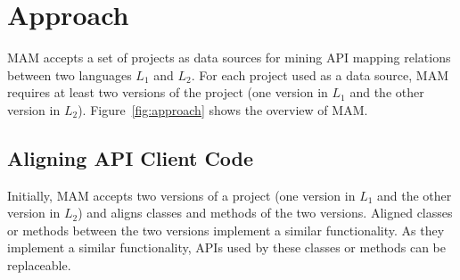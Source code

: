 \section{Approach}
\label{sec:approach}

MAM accepts a set of projects as data sources for mining API
mapping relations between two languages $L_1$ and $L_2$.
For each project used as a data source,
MAM requires at least two versions of the project (one
version in $L_1$ and the other version in $L_2$).
Figure~\ref{fig:approach} shows the overview of MAM.




\subsection{Aligning API Client Code}
\label{sec:approach:acc}

Initially, MAM accepts two versions of a project (one version in
$L_1$ and the other version in $L_2$) and aligns classes and methods
of the two versions. Aligned classes or methods
between the two versions implement a similar functionality. As they
implement a similar functionality, APIs used by these classes or methods can be
replaceable.

